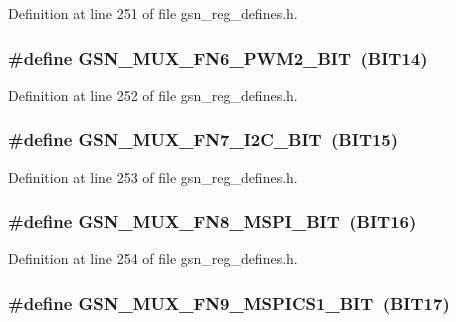 Definition at line 251 of file gsn\_\-reg\_\-defines.h.

\hypertarget{a00546_aee644fa9a1d55703a44ba429a9da380e}{
\subsubsection[{GSN\_\-MUX\_\-FN6\_\-PWM2\_\-BIT}]{\setlength{\rightskip}{0pt plus 5cm}\#define GSN\_\-MUX\_\-FN6\_\-PWM2\_\-BIT~(BIT14)}}
\label{a00546_aee644fa9a1d55703a44ba429a9da380e}


Definition at line 252 of file gsn\_\-reg\_\-defines.h.

\hypertarget{a00546_a2ca9c1f769bf59aa63b1f26818f061e6}{
\subsubsection[{GSN\_\-MUX\_\-FN7\_\-I2C\_\-BIT}]{\setlength{\rightskip}{0pt plus 5cm}\#define GSN\_\-MUX\_\-FN7\_\-I2C\_\-BIT~(BIT15)}}
\label{a00546_a2ca9c1f769bf59aa63b1f26818f061e6}


Definition at line 253 of file gsn\_\-reg\_\-defines.h.

\hypertarget{a00546_a85a4ab9c4f0c550e88fd9510e435889d}{
\subsubsection[{GSN\_\-MUX\_\-FN8\_\-MSPI\_\-BIT}]{\setlength{\rightskip}{0pt plus 5cm}\#define GSN\_\-MUX\_\-FN8\_\-MSPI\_\-BIT~(BIT16)}}
\label{a00546_a85a4ab9c4f0c550e88fd9510e435889d}


Definition at line 254 of file gsn\_\-reg\_\-defines.h.

\hypertarget{a00546_a58aa7fc2c22534cbe838de6ba03ce191}{
\subsubsection[{GSN\_\-MUX\_\-FN9\_\-MSPICS1\_\-BIT}]{\setlength{\rightskip}{0pt plus 5cm}\#define GSN\_\-MUX\_\-FN9\_\-MSPICS1\_\-BIT~(BIT17)}}
\label{a00546_a58aa7fc2c22534cbe838de6ba03ce191}


